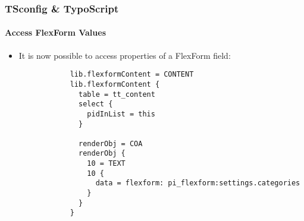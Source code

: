 \begin{frame}[fragile]
	\frametitle{TSconfig \& TypoScript}
	\framesubtitle{Access FlexForm Values}

	\lstset{basicstyle=\tiny\ttfamily}

	\begin{itemize}

		\item It is now possible to access properties of a FlexForm field:

		\begin{lstlisting}
			lib.flexformContent = CONTENT
			lib.flexformContent {
			  table = tt_content
			  select {
			    pidInList = this
			  }

			  renderObj = COA
			  renderObj {
			    10 = TEXT
			    10 {
			      data = flexform: pi_flexform:settings.categories
			    }
			  }
			}
		\end{lstlisting}

	\end{itemize}

\end{frame}

